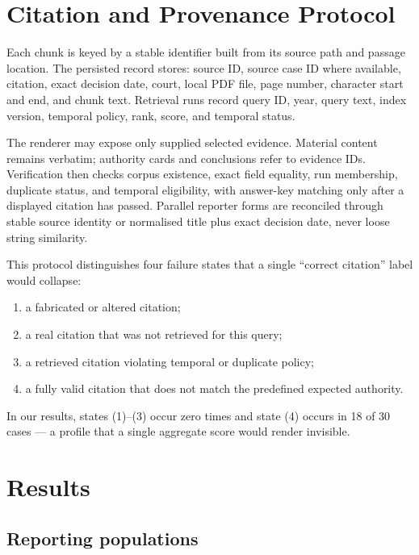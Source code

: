 \documentclass[conference]{IEEEtran}
\begin{document}
\section{Citation and Provenance Protocol}
\label{sec:protocol}

Each chunk is keyed by a stable identifier built from its source path and
passage
location. The persisted record stores: source ID, source
case ID where available, citation, exact decision date, court, local PDF
file, page number, character start and end, and chunk text. Retrieval runs record query ID, year,
query text, index version, temporal policy, rank, score, and temporal status.

The renderer may expose only supplied selected evidence. Material content
remains verbatim; authority cards and conclusions refer to evidence IDs.
Verification then checks corpus existence, exact field equality, run membership,
duplicate status, and temporal eligibility, with answer-key matching only
after a displayed citation has passed. Parallel reporter forms are
reconciled through stable source identity or normalised title plus exact
decision date, never loose string similarity.

This protocol distinguishes four failure states that a single
``correct citation'' label would collapse:

\begin{enumerate}
\item a fabricated or altered citation;
\item a real citation that was not retrieved for this query;
\item a retrieved citation violating temporal or duplicate policy;
\item a fully valid citation that does not match the predefined expected
authority.
\end{enumerate}

In our results, states (1)--(3) occur zero times and state (4) occurs
in 18 of 30 cases --- a profile that a single aggregate score would render
invisible.

\section{Results}
\label{sec:results}

\subsection{Reporting populations}
\end{document}
